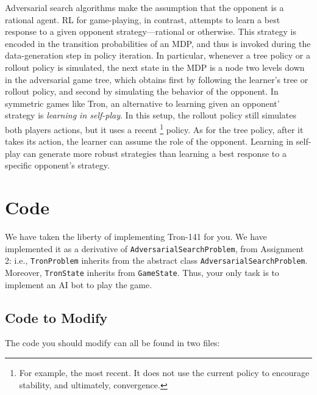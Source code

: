 \documentclass{article}
\begin{document}
Adversarial search algorithms make the assumption that the opponent is
a rational agent.  RL for game-playing, in contrast, attempts to learn
a best response to a given opponent strategy---rational or otherwise.
This strategy is encoded in the transition probabilities of an MDP,
and thus is invoked during the data-generation step in policy
iteration.  In particular, whenever a tree policy or a rollout policy
is simulated, the next state in the MDP is a node two levels down in
the adversarial game tree, which obtains first by following the
learner's tree or rollout policy, and second by simulating the
behavior of the opponent.  In symmetric games like Tron, an
alternative to learning given an opponent' strategy is \emph{learning
  in self-play}.  In this setup, the rollout policy still simulates
both players actions, but it uses a recent%
\footnote{For example, the most recent.  It does not use the current
  policy to encourage stability, and ultimately, convergence.}
policy.  As for the tree policy, after it takes its action, the
learner can assume the role of the opponent.  Learning in self-play
can generate more robust strategies than learning a best response to a
specific opponent's strategy.


\section{Code}
We have taken the liberty of implementing Tron-141 for you.  We have
implemented it as a derivative of \texttt{AdversarialSearchProblem}, from
Assignment 2: i.e., \texttt{TronProblem} inherits from the abstract class
\texttt{AdversarialSearchProblem}.
Moreover, \texttt{TronState} inherits from \texttt{GameState}.
Thus, your only task is to implement an AI bot to play the game.


\subsection{Code to Modify}
The code you should modify can all be found in two files:
\end{document}
